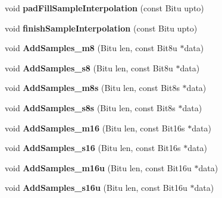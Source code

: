 \begin{DoxyCompactItemize}
\item 
\hypertarget{classMixerChannel_a40c11ec088fcd9268daaf652e4dcbdd1}{void {\bfseries pad\-Fill\-Sample\-Interpolation} (const Bitu upto)}\label{classMixerChannel_a40c11ec088fcd9268daaf652e4dcbdd1}

\item 
\hypertarget{classMixerChannel_a4c21cbd1be358d5704e64b6d38e1a0b7}{void {\bfseries finish\-Sample\-Interpolation} (const Bitu upto)}\label{classMixerChannel_a4c21cbd1be358d5704e64b6d38e1a0b7}

\item 
\hypertarget{classMixerChannel_af59a84741e0431cb88f4a7a1f9dc6bfc}{void {\bfseries Add\-Samples\-\_\-m8} (Bitu len, const Bit8u $\ast$data)}\label{classMixerChannel_af59a84741e0431cb88f4a7a1f9dc6bfc}

\item 
\hypertarget{classMixerChannel_a796d37eb57ceaf1b6bb08dffe397e7e9}{void {\bfseries Add\-Samples\-\_\-s8} (Bitu len, const Bit8u $\ast$data)}\label{classMixerChannel_a796d37eb57ceaf1b6bb08dffe397e7e9}

\item 
\hypertarget{classMixerChannel_ae6b5bc9c8265624bf8260320a72a991f}{void {\bfseries Add\-Samples\-\_\-m8s} (Bitu len, const Bit8s $\ast$data)}\label{classMixerChannel_ae6b5bc9c8265624bf8260320a72a991f}

\item 
\hypertarget{classMixerChannel_aea019d49b51a568eda0ae2d75fa94726}{void {\bfseries Add\-Samples\-\_\-s8s} (Bitu len, const Bit8s $\ast$data)}\label{classMixerChannel_aea019d49b51a568eda0ae2d75fa94726}

\item 
\hypertarget{classMixerChannel_ae5ccd98af78bb46f0b3c497ffc31747d}{void {\bfseries Add\-Samples\-\_\-m16} (Bitu len, const Bit16s $\ast$data)}\label{classMixerChannel_ae5ccd98af78bb46f0b3c497ffc31747d}

\item 
\hypertarget{classMixerChannel_a6f1d783dae6d1e462fcbae8405fc7809}{void {\bfseries Add\-Samples\-\_\-s16} (Bitu len, const Bit16s $\ast$data)}\label{classMixerChannel_a6f1d783dae6d1e462fcbae8405fc7809}

\item 
\hypertarget{classMixerChannel_ad636fa361ea10259a586aad5f2e140cc}{void {\bfseries Add\-Samples\-\_\-m16u} (Bitu len, const Bit16u $\ast$data)}\label{classMixerChannel_ad636fa361ea10259a586aad5f2e140cc}

\item 
\hypertarget{classMixerChannel_aea2887c8acf1c257aebac084292ddfbd}{void {\bfseries Add\-Samples\-\_\-s16u} (Bitu len, const Bit16u $\ast$data)}\label{classMixerChannel_aea2887c8acf1c257aebac084292ddfbd}


\end{DoxyCompactItemize}
